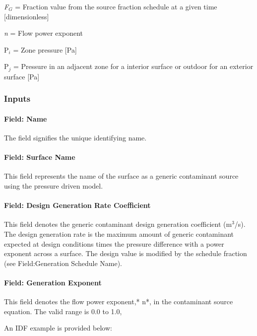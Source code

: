 \emph{F\(_{G}\)} = Fraction value from the source fraction schedule at a given time {[}dimensionless{]}

\emph{n} = Flow power exponent

P\emph{\(_{i}\)} = Zone pressure {[}Pa{]}

P\emph{\(_{j}\)} = Pressure in an adjacent zone for a interior surface or outdoor for an exterior surface {[}Pa{]}

\subsubsection{Inputs}\label{inputs-12-007}

\paragraph{Field: Name}\label{field-name-12-005}

The field signifies the unique identifying name.

\paragraph{Field: Surface Name}\label{field-surface-name-2-000}

This field represents the name of the surface as a generic contaminant source using the pressure driven model.

\paragraph{Field: Design Generation Rate Coefficient}\label{field-design-generation-rate-coefficient}

This field denotes the generic contaminant design generation coefficient (m\(^{3}\)/s). The design generation rate is the maximum amount of generic contaminant expected at design conditions times the pressure difference with a power exponent across a surface. The design value is modified by the schedule fraction (see Field:Generation Schedule Name).

\paragraph{Field: Generation Exponent}\label{field-generation-exponent}

This field denotes the flow power exponent,* n*, in the contaminant source equation. The valid range is 0.0 to 1.0,

An IDF example is provided below:

